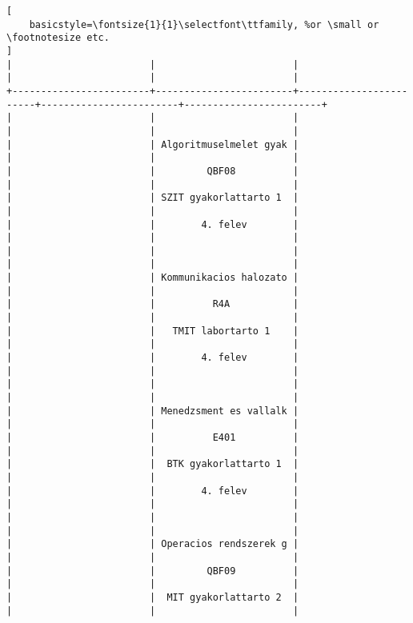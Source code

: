 \begin{lstlisting}[
    basicstyle=\fontsize{1}{1}\selectfont\ttfamily, %or \small or \footnotesize etc.
]
|                        |                        |                        |                        |                        | 
+------------------------+------------------------+------------------------+------------------------+------------------------+
|                        |                        |                        |                        |                        | 
|                        | Algoritmuselmelet gyak |                        |                        |                        | 
|                        |         QBF08          |                        |                        |                        | 
|                        | SZIT gyakorlattarto 1  |                        |                        |                        | 
|                        |        4. felev        |                        |                        |                        | 
|                        |                        |                        |                        |                        | 
|                        | Kommunikacios halozato |                        |                        |                        | 
|                        |          R4A           |                        |                        |                        | 
|                        |   TMIT labortarto 1    |                        |                        |                        | 
|                        |        4. felev        |                        |                        |                        | 
|                        |                        |                        |                        |                        | 
|                        | Menedzsment es vallalk |                        |                        |                        | 
|                        |          E401          |                        |                        |                        | 
|                        |  BTK gyakorlattarto 1  |                        |                        |                        | 
|                        |        4. felev        |                        |                        |                        | 
|                        |                        |                        |                        |                        | 
|                        | Operacios rendszerek g |                        |                        |                        | 
|                        |         QBF09          |                        |                        |                        | 
|                        |  MIT gyakorlattarto 2  |                        |                        |                        | 

\end{lstlisting}
